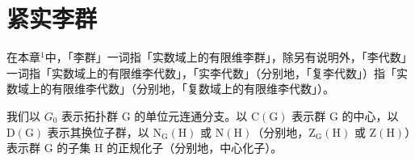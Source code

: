 \chapter{紧实李群}

在本章\(^{1}\)中，「李群」一词指「实数域上的有限维李群」，除另有说明外，「李代数」一词指「实数域上的有限维李代数」，「实李代数」（分别地，「复李代数」）指「实数域上的有限维李代数」（分别地，「复数域上的有限维李代数」）。

我们以 \(G_{0}\) 表示拓扑群 G 的单位元连通分支。以 \(\mathrm{C(G)}\) 表示群 G 的中心，以 \(\mathrm{D(G)}\) 表示其换位子群，以 \(\mathrm{N_{G}(H)}\) 或 \(\mathrm{N(H)}\)（分别地，\(\mathrm{Z_{G}(H)}\) 或 \(\mathrm{Z(H)}\)）表示群 G 的子集 H 的正规化子（分别地，中心化子）。

